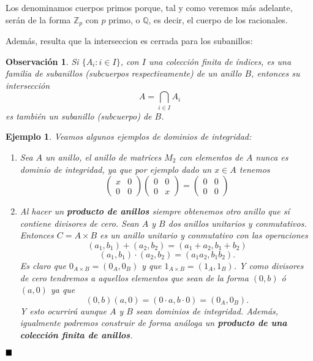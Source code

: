 \documentclass[12pt]{article}
\newtheorem{example}{Ejemplo}[theorem]
\newtheorem{observation}{Observación}[theorem]
\begin{document}
Los denominamos cuerpos primos porque, tal y como veremos más adelante, serán de la forma $\mathbb{Z}_p$ con $p$ primo, o $\mathbb{Q}$, es decir, el cuerpo de los racionales.

Además, resulta que la interseccion es cerrada para los subanillos: 

\begin{observation} Si $\lbrace A_{i}: i \in I\rbrace$, con $I$ una colección finita de índices, es una familia de subanillos (subcuerpos respectivamente) de un anillo $B$, entonces su intersección $$A = \bigcap_{i \in I} A_{i}$$ es también un subanillo (subcuerpo) de $B$.
\end{observation}

\begin{example} Veamos algunos ejemplos de dominios de integridad: \begin{enumerate}
\item Sea $A$ un anillo, el anillo de matrices $M_{2}$ con elementos de $A$ nunca es dominio de integridad, ya que por ejemplo dado un $x \in A$ tenemos $$\left( \begin{matrix}
x & 0 \\
0 & 0
\end{matrix}
\right) \left( \begin{matrix}
0 & 0 \\
0 & x
\end{matrix}
\right) = \left( \begin{matrix}
0 & 0 \\
0 & 0
\end{matrix}
\right)$$
\item Al hacer un \textbf{producto de anillos} siempre obtenemos otro anillo que sí contiene divisores de cero. Sean $A$ y $B$ dos anillos unitarios y conmutativos. Entonces $C = A \times B$ es un anillo unitario y conmutativo con las operaciones $$(a_{1},b_{1}) + (a_{2},b_{2}) = (a_{1}+a_{2}, b_{1}+b_{2})$$ $$(a_{1},b_{1}) \cdot (a_{2},b_{2}) = (a_{1}a_{2},b_{1}b_{2}).$$ Es claro que $0_{A\times B} = (0_{A},0_{B})$ y que $1_{A \times B} = (1_{A},1_{B})$. Y como divisores de cero tendremos a aquellos elementos que sean de la forma $(0,b)$ ó $(a,0)$ ya que $$(0,b)(a,0) = (0 \cdot a, b \cdot 0) = (0_{A}, 0_{B}).$$ Y esto ocurrirá aunque $A$ y $B$ sean dominios de integridad. Además, igualmente podremos construir de forma análoga un \textbf{producto de una colección finita de anillos}.
\end{enumerate}
\end{example}
$\hfill \blacksquare$
\end{document}
